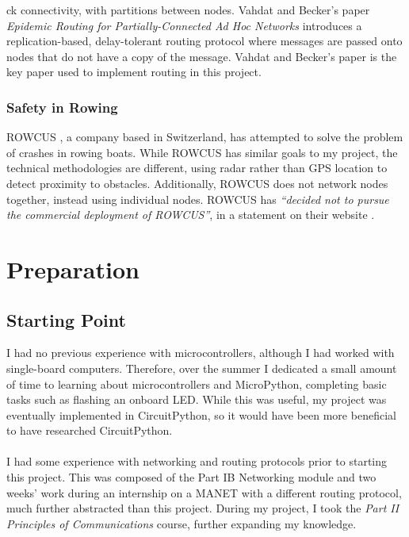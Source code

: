 \documentclass[12pt,a4paper]{report}
\newcommand{\newchapter}[2]{
    \setcounter{chapter}{#1}
    \setcounter{section}{0}
    \chapter*{#2}
    \addcontentsline{toc}{chapter}{#1 #2}
}
\begin{document}
ck connectivity, with partitions between nodes. Vahdat and Becker's paper \emph{Epidemic Routing for Partially-Connected Ad Hoc Networks} \cite{epidemic} introduces a replication-based, delay-tolerant routing protocol where messages are passed onto nodes that do not have a copy of the message. Vahdat and Becker's paper is the key paper used to implement routing in this project. \\

\subsection{Safety in Rowing}
ROWCUS \cite{rowcus}, a company based in Switzerland, has attempted to solve the problem of crashes in rowing boats. While ROWCUS has similar goals to my project, the technical methodologies are different, using radar rather than GPS location to detect proximity to obstacles. Additionally, ROWCUS does not network nodes together, instead using individual nodes. ROWCUS has \emph{``decided not to pursue the commercial deployment of ROWCUS''}, in a statement on their website \cite{rowcus}. \\


\newchapter{2}{Preparation}
\setcounter{figure}{0}
\section{Starting Point} 
I had no previous experience with microcontrollers, although I had worked with single-board computers. Therefore, over the summer I dedicated a small amount of time to learning about microcontrollers and MicroPython, completing basic tasks such as flashing an onboard LED. While this was useful, my project was eventually implemented in CircuitPython, so it would have been more beneficial to have researched CircuitPython. \\ \\
I had some experience with networking and routing protocols prior to starting this project. This was composed of the Part IB Networking module and two weeks' work during an internship on a MANET with a different routing protocol, much further abstracted than this project. During my project, I took the \emph{Part II Principles of Communications} course, further expanding my knowledge. \\
\end{document}
